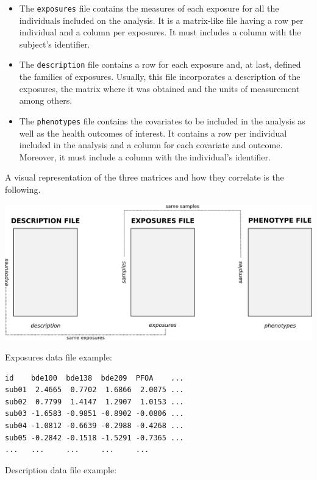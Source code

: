 \documentclass[
]{book}
\providecommand{\tightlist}{%
  \setlength{\itemsep}{0pt}\setlength{\parskip}{0pt}}
\begin{document}
\begin{itemize}
\tightlist
\item
  The \texttt{exposures} file contains the measures of each exposure for all the individuals included on the analysis. It is a matrix-like file having a row per individual and a column per exposures. It must includes a column with the subject's identifier.
\item
  The \texttt{description} file contains a row for each exposure and, at last, defined the families of exposures. Usually, this file incorporates a description of the exposures, the matrix where it was obtained and the units of measurement among others.
\item
  The \texttt{phenotypes} file contains the covariates to be included in the analysis as well as the health outcomes of interest. It contains a row per individual included in the analysis and a column for each covariate and outcome. Moreover, it must include a column with the individual's identifier.
\end{itemize}

A visual representation of the three matrices and how they correlate is the following.

\includegraphics{images/exposome_dataset_struct.png}

Exposures data file example:

\begin{verbatim}
id    bde100  bde138  bde209  PFOA    ...
sub01  2.4665  0.7702  1.6866  2.0075 ...
sub02  0.7799  1.4147  1.2907  1.0153 ...  
sub03 -1.6583 -0.9851 -0.8902 -0.0806 ... 
sub04 -1.0812 -0.6639 -0.2988 -0.4268 ... 
sub05 -0.2842 -0.1518 -1.5291 -0.7365 ... 
...   ...     ...     ...     ...
\end{verbatim}

Description data file example:
\end{document}
